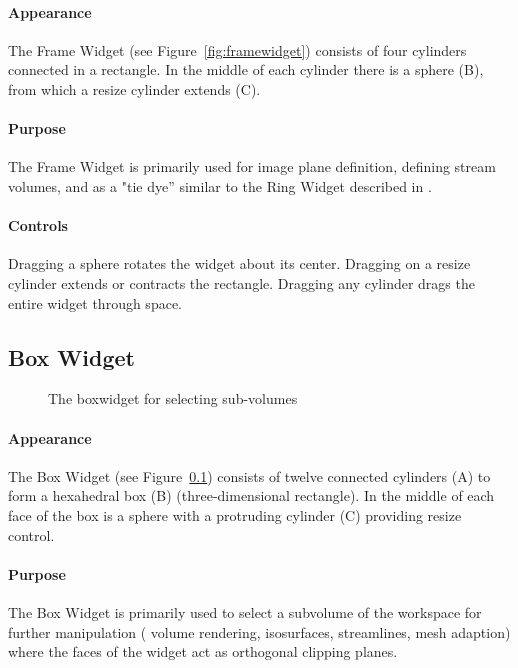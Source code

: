 \paragraph{Appearance} The
Frame Widget (see Figure~\ref{fig:framewidget}) consists of four cylinders connected in a rectangle.  In
the middle of each cylinder there is a sphere (B), from which
a resize cylinder extends (C).

\paragraph{Purpose} The Frame Widget is primarily used for image
plane definition, defining stream volumes, and as a "tie dye'' similar to
the Ring Widget described in .

\paragraph{Controls} Dragging a sphere rotates the widget about its center. Dragging on a resize cylinder extends or contracts the rectangle.
Dragging any cylinder drags the entire widget through space.


\subsection{Box Widget}
\label{sec:view-boxwidget} 

\begin{figure}[htb]
  \begin{makeimage}
  \end{makeimage}
  \boxwidget
  \caption{\label{fig:boxwidget} The boxwidget for selecting sub-volumes}
\end{figure}

\paragraph{Appearance} The Box
Widget (see Figure~\ref{sec:view-boxwidget}) consists of twelve 
connected cylinders (A) to form a hexahedral box (B) (three-dimensional
rectangle).  In the middle of each face of the box is a sphere with a protruding cylinder (C) providing resize control.

\paragraph{Purpose} The Box Widget is primarily used to select a
subvolume of the workspace for further manipulation (\eg{} volume
rendering, isosurfaces, streamlines, mesh adaption) where the faces of the
widget act as orthogonal clipping planes.

